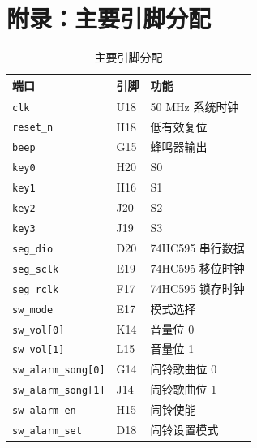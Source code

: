 \documentclass[UTF8,a4paper,12pt]{ctexart}
\newcommand{\port}[1]{\texttt{#1}}
\begin{document}
\section{附录：主要引脚分配}

\begin{table}[H]
  \centering
  \caption{主要引脚分配}
  \begin{tabular}{lll}
    \toprule
    端口 & 引脚 & 功能 \\
    \midrule
    \port{clk} & U18 & 50 MHz 系统时钟 \\
    \port{reset\_n} & H18 & 低有效复位 \\
    \port{beep} & G15 & 蜂鸣器输出 \\
    \port{key0} & H20 & S0 \\
    \port{key1} & H16 & S1 \\
    \port{key2} & J20 & S2 \\
    \port{key3} & J19 & S3 \\
    \port{seg\_dio} & D20 & 74HC595 串行数据 \\
    \port{seg\_sclk} & E19 & 74HC595 移位时钟 \\
    \port{seg\_rclk} & F17 & 74HC595 锁存时钟 \\
    \port{sw\_mode} & E17 & 模式选择 \\
    \port{sw\_vol[0]} & K14 & 音量位 0 \\
    \port{sw\_vol[1]} & L15 & 音量位 1 \\
    \port{sw\_alarm\_song[0]} & G14 & 闹铃歌曲位 0 \\
    \port{sw\_alarm\_song[1]} & J14 & 闹铃歌曲位 1 \\
    \port{sw\_alarm\_en} & H15 & 闹铃使能 \\
    \port{sw\_alarm\_set} & D18 & 闹铃设置模式 \\
    \bottomrule
  \end{tabular}
\end{table}
\end{document}
